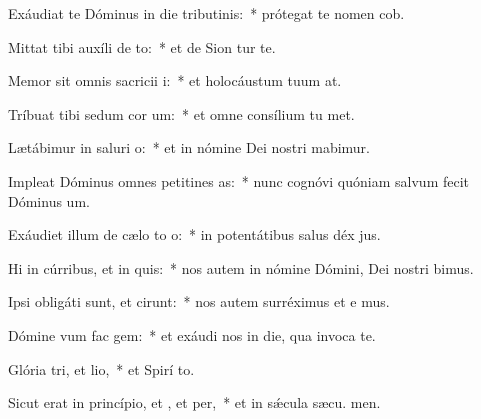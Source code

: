 \item Exáudiat te Dóminus in die tributinis:~* prótegat te nomen  cob.
\item Mittat tibi auxíli de to:~* et de Sion tur te.
\item Memor sit omnis sacricii i:~* et holocáustum tuum  at.
\item Tríbuat tibi sedum cor um:~* et omne consílium tu met.
\item Lætábimur in saluri o:~* et in nómine Dei nostri mabimur.
\item Impleat Dóminus omnes petitines as:~* nunc cognóvi quóniam salvum fecit Dóminus  um.
\item Exáudiet illum de cælo to o:~* in potentátibus salus déx jus.
\item Hi in cúrribus, et  in quis:~* nos autem in nómine Dómini, Dei nostri bimus.
\item Ipsi obligáti sunt, et cirunt:~* nos autem surréximus et e mus.
\item Dómine vum fac gem:~* et exáudi nos in die, qua invoca te.
\item Glória tri, et lio,~* et Spirí to.
\item Sicut erat in princípio, et , et per,~* et in sǽcula sæcu. men.
